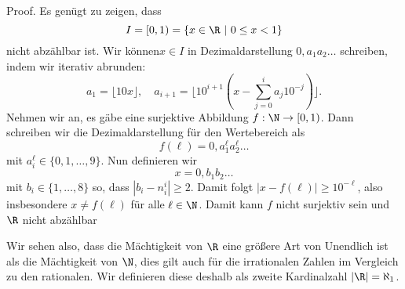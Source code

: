 \documentclass[letterpaper,10pt,english]{jupyterBook}
\begin{document}
\begin{emphBox}{}{}
Proof.   Es genügt zu zeigen, dass
\begin{equation*}
I=[0,1) = \{ x \in \R~|~0 \leq x < 1\}
\end{equation*}
nicht abzählbar ist. Wir können\(x \in I\) in Dezimaldarstellung \(0,a_1a_2 \ldots\) schreiben, indem wir iterativ abrunden:
\begin{equation*}
a_1 = \lfloor 10 x \rfloor, \quad a_{i+1} = \lfloor 10^{i+1}(x-\sum_{j=0}^i a_j 10^{-j})\rfloor.
\end{equation*}
Nehmen wir an, es gäbe eine surjektive Abbildung \(f: \N \rightarrow [0,1)\). Dann schreiben wir die Dezimaldarstellung für den Wertebereich als
\begin{equation*}
f(\ell) = 0,a_1^\ell a_2^\ell \ldots
\end{equation*}
mit \(a_i^\ell \in \{0,1,\ldots,9\}\). Nun definieren wir
\begin{equation*}
x=0,b_1 b_2 \ldots
\end{equation*}
mit \(b_i \in \{1,\ldots,8\}\) so, dass \(|b_i - n_i^i| \geq 2\). Damit folgt \(|x-f(\ell)|\geq 10^{-\ell}\), also insbesondere \(x \neq f(\ell)\) für alle \(\ell \in \N\). Damit kann \(f\) nicht surjektiv sein und \(\R\) nicht abzählbar
\end{emphBox}

Wir sehen also, dass die Mächtigkeit von \(\R\) eine größere Art von Unendlich ist als die Mächtigkeit von \(\N\), dies gilt auch für die irrationalen Zahlen im Vergleich zu den rationalen. Wir definieren diese deshalb als zweite Kardinalzahl \(|\R|= \aleph_1\).
\end{document}
